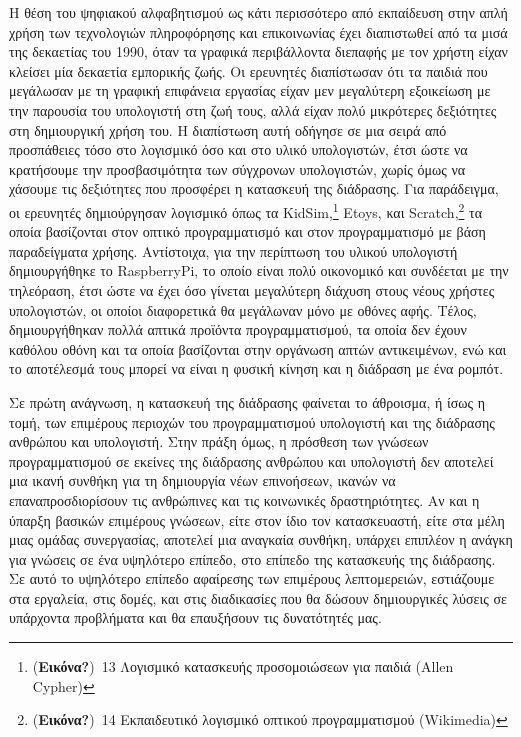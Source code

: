 \documentclass[
]{article}
\begin{document}
Η θέση του ψηφιακού αλφαβητισμού ως κάτι περισσότερο από εκπαίδευση στην
απλή χρήση των τεχνολογιών πληροφόρησης και επικοινωνίας έχει
διαπιστωθεί από τα μισά της δεκαετίας του 1990, όταν τα γραφικά
περιβάλλοντα διεπαφής με τον χρήστη είχαν κλείσει μία δεκαετία εμπορικής
ζωής. Οι ερευνητές διαπίστωσαν ότι τα παιδιά που μεγάλωσαν με τη γραφική
επιφάνεια εργασίας είχαν μεν μεγαλύτερη εξοικείωση με την παρουσία του
υπολογιστή στη ζωή τους, αλλά είχαν πολύ μικρότερες δεξιότητες στη
δημιουργική χρήση του. Η διαπίστωση αυτή οδήγησε σε μια σειρά από
προσπάθειες τόσο στο λογισμικό όσο και στο υλικό υπολογιστών, έτσι ώστε
να κρατήσουμε την προσβασιμότητα των σύγχρονων υπολογιστών, χωρίς όμως
να χάσουμε τις δεξιότητες που προσφέρει η κατασκευή της διάδρασης. Για
παράδειγμα, οι ερευνητές δημιούργησαν λογισμικό όπως τα
KidSim,\footnote{(\textbf{Εικόνα?})~13 Λογισμικό κατασκευής
  προσομοιώσεων για παιδιά (Allen Cypher)} Etoys, και
Scratch,\footnote{(\textbf{Εικόνα?})~14 Εκπαιδευτικό λογισμικό οπτικού
  προγραμματισμού (Wikimedia)} τα οποία βασίζονται στον οπτικό
προγραμματισμό και στον προγραμματισμό με βάση παραδείγματα χρήσης.
Αντίστοιχα, για την περίπτωση του υλικού υπολογιστή δημιουργήθηκε το
RaspberryPi, το οποίο είναι πολύ οικονομικό και συνδέεται με την
τηλεόραση, έτσι ώστε να έχει όσο γίνεται μεγαλύτερη διάχυση στους νέους
χρήστες υπολογιστών, οι οποίοι διαφορετικά θα μεγάλωναν μόνο με οθόνες
αφής. Τέλος, δημιουργήθηκαν πολλά απτικά προϊόντα προγραμματισμού, τα
οποία δεν έχουν καθόλου οθόνη και τα οποία βασίζονται στην οργάνωση
απτών αντικειμένων, ενώ και το αποτέλεσμά τους μπορεί να είναι η φυσική
κίνηση και η διάδραση με ένα ρομπότ.

Σε πρώτη ανάγνωση, η κατασκευή της διάδρασης φαίνεται το άθροισμα, ή
ίσως η τομή, των επιμέρους περιοχών του προγραμματισμού υπολογιστή και
της διάδρασης ανθρώπου και υπολογιστή. Στην πράξη όμως, η πρόσθεση των
γνώσεων προγραμματισμού σε εκείνες της διάδρασης ανθρώπου και υπολογιστή
δεν αποτελεί μια ικανή συνθήκη για τη δημιουργία νέων επινοήσεων, ικανών
να επαναπροσδιορίσουν τις ανθρώπινες και τις κοινωνικές δραστηριότητες.
Αν και η ύπαρξη βασικών επιμέρους γνώσεων, είτε στον ίδιο τον
κατασκευαστή, είτε στα μέλη μιας ομάδας συνεργασίας, αποτελεί μια
αναγκαία συνθήκη, υπάρχει επιπλέον η ανάγκη για γνώσεις σε ένα υψηλότερο
επίπεδο, στο επίπεδο της κατασκευής της διάδρασης. Σε αυτό το υψηλότερο
επίπεδο αφαίρεσης των επιμέρους λεπτομερειών, εστιάζουμε στα εργαλεία,
στις δομές, και στις διαδικασίες που θα δώσουν δημιουργικές λύσεις σε
υπάρχοντα προβλήματα και θα επαυξήσουν τις δυνατότητές μας.
\end{document}
